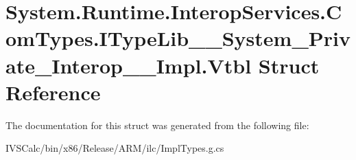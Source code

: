 \hypertarget{struct_system_1_1_runtime_1_1_interop_services_1_1_com_types_1_1_i_type_lib_____system___private___interop_____impl_1_1_vtbl}{}\section{System.\+Runtime.\+Interop\+Services.\+Com\+Types.\+I\+Type\+Lib\+\_\+\+\_\+\+System\+\_\+\+Private\+\_\+\+Interop\+\_\+\+\_\+\+Impl.\+Vtbl Struct Reference}
\label{struct_system_1_1_runtime_1_1_interop_services_1_1_com_types_1_1_i_type_lib_____system___private___interop_____impl_1_1_vtbl}


The documentation for this struct was generated from the following file\+:\begin{DoxyCompactItemize}
\item 
I\+V\+S\+Calc/bin/x86/\+Release/\+A\+R\+M/ilc/Impl\+Types.\+g.\+cs\end{DoxyCompactItemize}
